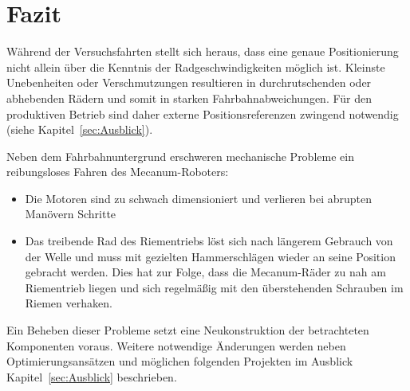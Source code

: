 
\section{Fazit}
\label{sec:Fazit}

Während der Versuchsfahrten stellt sich heraus, dass eine genaue Positionierung nicht allein über die Kenntnis der Radgeschwindigkeiten möglich ist.
Kleinste Unebenheiten oder Verschmutzungen resultieren in durchrutschenden oder abhebenden Rädern und somit in starken Fahrbahnabweichungen.
Für den produktiven Betrieb sind daher externe Positionsreferenzen zwingend notwendig (siehe Kapitel~\ref{sec:Ausblick}).

Neben dem Fahrbahnuntergrund erschweren mechanische Probleme ein reibungsloses Fahren des Mecanum-Roboters:

\begin{itemize}
    \item{Die Motoren sind zu schwach dimensioniert und verlieren bei abrupten Manövern Schritte}
    \item{Das treibende Rad des Riementriebs löst sich nach längerem Gebrauch von der Welle und muss mit gezielten Hammerschlägen wieder an seine Position gebracht werden. Dies hat zur Folge, dass die Mecanum-Räder zu nah am Riementrieb liegen und sich regelmäßig mit den überstehenden Schrauben im Riemen verhaken.}
\end{itemize}

Ein Beheben dieser Probleme setzt eine Neukonstruktion der betrachteten Komponenten voraus. Weitere notwendige Änderungen werden neben Optimierungsansätzen und möglichen folgenden Projekten im Ausblick Kapitel~\ref{sec:Ausblick} beschrieben.
